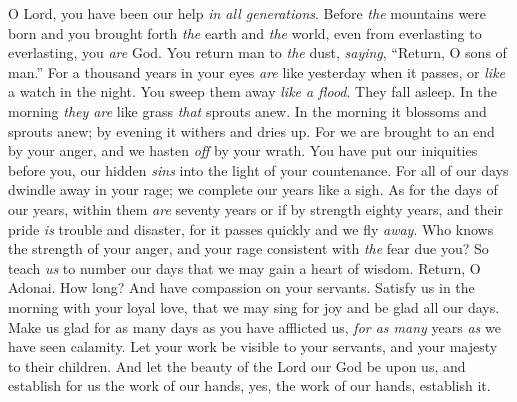 \begin{biblechapter} %
 O Lord, you have been our help \textit{in all generations}.
\verse Before \textit{the} mountains were born 
and you brought forth \textit{the} earth and \textit{the} world, 
even from everlasting to everlasting, you \textit{are} God.
\verse You return man to \textit{the} dust, 
\textit{saying}, “Return, O sons of man.”
\verse For a thousand years in your eyes 
\textit{are} like yesterday when it passes, 
or \textit{like} a watch in the night.
\verse You sweep them away \textit{like a flood}. 
They fall asleep. 
In the morning \textit{they are} like grass \textit{that} sprouts anew.
\verse In the morning it blossoms and sprouts anew; 
by evening it withers and dries up.
\verse For we are brought to an end by your anger, 
and we hasten \textit{off} by your wrath.
\verse You have put our iniquities before you, 
our hidden \textit{sins} into the light of your countenance.
\verse For all of our days dwindle away in your rage; 
we complete our years like a sigh.
\verse As for the days of our years, within them \textit{are} seventy years 
or if by strength eighty years, and their pride \textit{is} trouble and disaster, 
for it passes quickly and we fly \textit{away}.
\verse Who knows the strength of your anger, 
and your rage consistent with \textit{the} fear due you?
\verse So teach \textit{us} to number our days 
that we may gain a heart of wisdom.
\verse Return, O Adonai. How long? 
And have compassion on your servants.
\verse Satisfy us in the morning with your loyal love, 
that we may sing for joy and be glad all our days.
\verse Make us glad for as many days as you have afflicted us, 
\textit{for as many} years \textit{as} we have seen calamity.
\verse Let your work be visible to your servants, 
and your majesty to their children.
\verse And let the beauty of the Lord our God be upon us, 
and establish for us the work of our hands, 
yes, the work of our hands, establish it.
\end{biblechapter}

